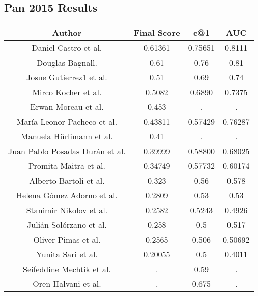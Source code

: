 \subsection{Pan 2015 Results}



\begin{center}
\begin{tabular}{|c|c|c|c|}
\hline
\textbf{Author}          & \textbf{Final Score} & \textbf{c@1} & \textbf{AUC} \\ \hline
Daniel Castro et al. & 0.61361 & 0.75651 & 0.8111 \\ \hline
Douglas Bagnall. & 0.61 & 0.76 & 0.81 \\ \hline
Josue Gutierrez1 et al. & 0.51 & 0.69 & 0.74 \\ \hline
Mirco Kocher et al. & 0.5082 & 0.6890 & 0.7375 \\ \hline
Erwan Moreau et al. & 0.453 & . & . \\ \hline
María Leonor Pacheco et al. & 0.43811 & 0.57429 & 0.76287 \\ \hline
Manuela Hürlimann et al. & 0.41 & . & . \\ \hline
Juan Pablo Posadas Durán et al. & 0.39999 & 0.58800 & 0.68025 \\ \hline
Promita Maitra et al. & 0.34749  & 0.57732 & 0.60174 \\ \hline
Alberto Bartoli et al. & 0.323 & 0.56 & 0.578 \\ \hline
Helena Gómez Adorno et al. & 0.2809 & 0.53 & 0.53 \\ \hline
Stanimir Nikolov et al. & 0.2582 & 0.5243 & 0.4926 \\ \hline
Julián Solórzano et al. & 0.258 & 0.5 & 0.517 \\ \hline
Oliver Pimas et al. & 0.2565  & 0.506 & 0.50692 \\ \hline
Yunita Sari et al. & 0.20055 & 0.5 & 0.4011 \\ \hline
Seifeddine Mechtik et al. & .  & 0.59 & . \\ \hline
Oren Halvani et al. & . & 0.675 & . \\ \hline
\end{tabular}
\end{center}